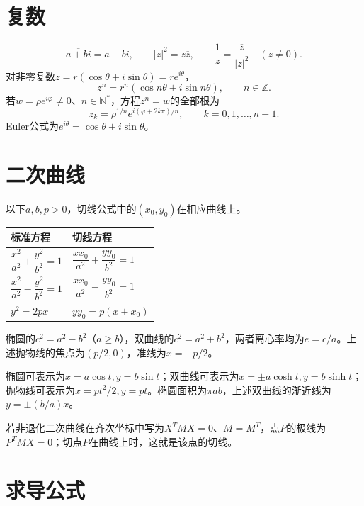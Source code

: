 \section{复数}
\begin{equation*}
 \overline{a+bi}=a-bi,\qquad
 |z|^2=z\overline z,\qquad
 \frac1z=\frac{\overline z}{|z|^2}\quad(z\ne0).
\end{equation*}
对非零复数\(z=r(\cos\theta+i\sin\theta)=re^{i\theta}\)，
\begin{equation*}
 z^n=r^n(\cos n\theta+i\sin n\theta),\qquad n\in\mathbb Z.
\end{equation*}
若\(w=\rho e^{i\varphi}\ne0\)、\(n\in\mathbb N^*\)，方程\(z^n=w\)的全部根为
\begin{equation*}
 z_k=\rho^{1/n}e^{i(\varphi+2k\pi)/n},\qquad k=0,1,\ldots,n-1.
\end{equation*}
Euler公式为\(e^{i\theta}=\cos\theta+i\sin\theta\)。

\section{二次曲线}

以下\(a,b,p>0\)，切线公式中的\((x_0,y_0)\)在相应曲线上。
\begingroup
\renewcommand{\arraystretch}{1.3}
\begin{longtable}{@{}p{.41\linewidth}p{.53\linewidth}@{}}
\toprule
标准方程 & 切线方程 \\
\midrule
\endhead
\(\dfrac{x^2}{a^2}+\dfrac{y^2}{b^2}=1\) & \(\dfrac{xx_0}{a^2}+\dfrac{yy_0}{b^2}=1\) \\[6pt]
\(\dfrac{x^2}{a^2}-\dfrac{y^2}{b^2}=1\) & \(\dfrac{xx_0}{a^2}-\dfrac{yy_0}{b^2}=1\) \\[6pt]
\(y^2=2px\) & \(yy_0=p(x+x_0)\) \\
\bottomrule
\end{longtable}
\endgroup
椭圆的\(c^2=a^2-b^2\)（\(a\ge b\)），双曲线的\(c^2=a^2+b^2\)，两者离心率均为\(e=c/a\)。上述抛物线的焦点为\((p/2,0)\)，准线为\(x=-p/2\)。

椭圆可表示为\(x=a\cos t,y=b\sin t\)；双曲线可表示为\(x=\pm a\cosh t,y=b\sinh t\)；抛物线可表示为\(x=pt^2/2,y=pt\)。椭圆面积为\(\pi ab\)，上述双曲线的渐近线为\(y=\pm(b/a)x\)。

若非退化二次曲线在齐次坐标中写为\(X^TMX=0\)、\(M=M^T\)，点\(P\)的极线为\(P^TMX=0\)；切点\(P\)在曲线上时，这就是该点的切线。

\newpage
\section{求导公式}


